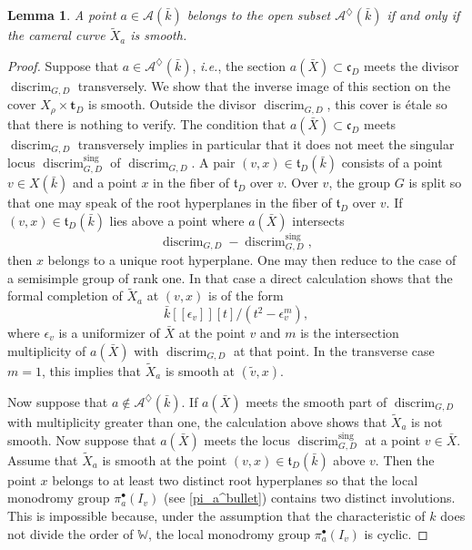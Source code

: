 \documentclass[12pt,english]{smfart}
\numberwithin{equation}{subsection}
\newtheorem{lemma}[equation]{Lemma}
\theoremstyle{remark}
\begin{document}
\begin{lemma}\label{cameral lisse}
A point $a\in\mathcal{A}(\bar{k})$ belongs to the open subset $\mathcal{A}^\diamondsuit(\bar{k})$
if and only if the cameral curve $\widetilde{X}_a$ is smooth.
\end{lemma}

\begin{proof}
Suppose that $a\in\mathcal{A}^\diamondsuit(\bar{k})$, \emph{i.e.}, the section $a(\bar{X})\subset \mathfrak{c}_D$
meets the divisor $\operatorname{discrim}_{G,D}$ transversely. We show that the inverse image of this section on the
cover $X_\rho\times \mathbf{t}_D$ is smooth. Outside the divisor $\operatorname{discrim}_{G,D}$, this cover is \'etale so that there is nothing to verify.
The condition that $a(\bar{X})\subset \mathfrak{c}_D$ meets $\operatorname{discrim}_{G,D}$ transversely
implies in particular that it does not meet the singular locus $\operatorname{discrim}_{G,D}^{\mathrm{sing}}$ of $\operatorname{discrim}_{G,D}$.
A pair $(v,x)\in \mathfrak{t}_D(\bar{k})$ consists of a point $v\in X(\bar{k})$ and a point $x$ in the fiber
of $\mathfrak{t}_D$ over $v$. Over $v$, the group $G$ is split so that one may speak of the root hyperplanes in the fiber of
$\mathfrak{t}_D$ over $v$. If $(v,x)\in \mathfrak{t}_D(\bar{k})$ lies above a point where $a(\bar{X})$ intersects
$$
\operatorname{discrim}_{G,D}-\operatorname{discrim}_{G,D}^{\mathrm{sing}},
$$
then $x$ belongs to a unique root hyperplane. One may then reduce to the case of a semisimple group of rank one.
In that case a direct calculation shows that the formal completion of $\widetilde{X}_a$ at $(v,x)$ is of the form
$$
\bar{k}[[\epsilon_v]][t]/(t^2-\epsilon_v^m),
$$
where $\epsilon_v$ is a uniformizer of $\bar{X}$ at the point $v$ and $m$ is the intersection multiplicity
of $a(\bar{X})$ with $\operatorname{discrim}_{G,D}$ at that point. In the transverse case $m=1$, this implies that
$\widetilde{X}_a$ is smooth at $(\tilde{v},x)$.

Now suppose that $a\notin \mathcal{A}^\diamondsuit(\bar{k})$. If $a(\bar{X})$ meets the smooth part of $\operatorname{discrim}_{G,D}$
with multiplicity greater than one, the calculation above shows that $\widetilde{X}_a$ is not smooth.
Now suppose that $a(\bar{X})$ meets the locus $\operatorname{discrim}_{G,D}^{\mathrm{sing}}$ at a point $v\in \bar{X}$.
Assume that $\widetilde{X}_a$ is smooth at the point $(v,x)\in \mathfrak{t}_D(\bar{k})$ above $v$.
Then the point $x$ belongs to at least two distinct root hyperplanes so that the local monodromy group $\pi_a^\bullet(I_v)$ (see \ref{pi_a^bullet})
contains two distinct involutions. This is impossible because, under the assumption that the characteristic of $k$
does not divide the order of $\mathbb{W}$, the local monodromy group $\pi_a^\bullet(I_v)$ is cyclic.
\end{proof}
\end{document}
